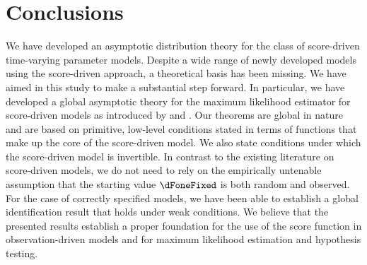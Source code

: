 \section{Conclusions} \label{sec7}

We have developed
an asymptotic distribution theory for the class of score-driven time-varying parameter models. Despite a wide range of newly developed models using the score-driven approach, a theoretical basis has been missing. We have aimed in this study to make a substantial step forward. 
%
In particular, we have developed a global asymptotic theory for the maximum likelihood estimator
for score-driven models as introduced by \citet{CKL2011,CKL2013} and \citet{harvey2013}. 
Our theorems are global in nature and are based on primitive, low-level conditions stated in terms of functions that make up the core of the score-driven model.
We also state conditions under which the score-driven model is invertible.
In contrast to the existing literature on score-driven models,  we do not need to rely on the empirically untenable assumption that the starting value $\dFoneFixed$ is both random and observed. 
For the case of correctly specified models, we have been able to establish a global identification result 
that holds under weak conditions.
We believe that the presented results establish a proper foundation for the use of the score function in observation-driven models and for maximum likelihood estimation and hypothesis testing.

